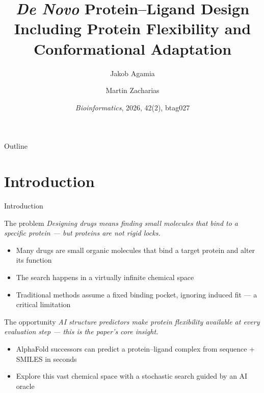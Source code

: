 \documentclass{beamer}
\title[\textit{De Novo} Protein--Ligand Design]{\textit{De Novo} Protein--Ligand Design Including Protein Flexibility and Conformational Adaptation}
\author{Jakob Agamia \and Martin Zacharias}
\institute{Technical University Munich}
\date{\textit{Bioinformatics}, 2026, 42(2), btag027}
\begin{document}
\begin{frame}
  \titlepage
\end{frame}

\begin{frame}{Outline}
  \tableofcontents
\end{frame}

\section{Introduction}

\begin{frame}{Introduction}
  \begin{block}{The problem}
    \textit{Designing drugs means finding small molecules that bind to a specific protein --- but proteins are not rigid locks.}
    \begin{itemize}
      \item Many drugs are small organic molecules that bind a target protein and alter its function
      \item The search happens in a virtually infinite chemical space
      \item Traditional methods assume a fixed binding pocket, ignoring induced fit --- a critical limitation
    \end{itemize}
  \end{block}

  \vspace{0.5em}

  \begin{block}{The opportunity}
    \textit{AI structure predictors make protein flexibility available at every evaluation step --- this is the paper's core insight.}
    \begin{itemize}
      \item AlphaFold successors can predict a protein--ligand complex from sequence + SMILES in seconds
      \item Explore this vast chemical space with a stochastic search guided by an AI oracle
    \end{itemize}
  \end{block}
\end{frame}
\end{document}
